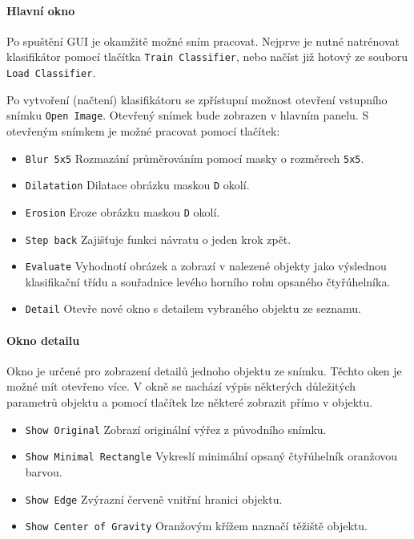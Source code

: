 \documentclass[12pt]{article}
\begin{document}
\paragraph{Hlavní okno}
Po spuštění GUI je okamžitě možné sním pracovat. Nejprve je nutné natrénovat klasifikátor pomocí tlačítka \texttt{Train Classifier}, nebo načíst již hotový ze souboru \texttt{Load Classifier}.

Po vytvoření (načtení) klasifikátoru se zpřístupní možnost otevření vstupního snímku \texttt{Open Image}. Otevřený snímek bude zobrazen v hlavním panelu. S otevřeným snímkem je možné pracovat pomocí tlačítek:
\begin{itemize}
\renewcommand\labelitemi{--}
\setlength\itemsep{1px}
\item{\texttt{Blur 5x5}} Rozmazání průměrováním pomocí masky o rozměrech \texttt{5x5}.
\item{\texttt{Dilatation}} Dilatace obrázku maskou \texttt{D} okolí.
\item{\texttt{Erosion}} Eroze obrázku maskou \texttt{D} okolí.
\item{\texttt{Step back}} Zajišťuje funkci návratu o jeden krok zpět.
\item{\texttt{Evaluate}} Vyhodnotí obrázek a zobrazí v nalezené objekty jako výslednou klasifikační třídu a souřadnice levého horního rohu opsaného čtyřúhelníka.
\item{\texttt{Detail}} Otevře nové okno s detailem vybraného objektu ze seznamu.
\end{itemize}

\paragraph{Okno detailu}
Okno je určené pro zobrazení detailů jednoho objektu ze snímku. Těchto oken je možné mít otevřeno více. V okně se nachází výpis některých důležitých parametrů objektu a pomocí tlačítek lze některé zobrazit přímo v objektu.

\begin{itemize}
\renewcommand\labelitemi{--}
\setlength\itemsep{1px}
\item{\texttt{Show Original}} Zobrazí originální výřez z původního snímku.
\item{\texttt{Show Minimal Rectangle}} Vykreslí minimální opsaný čtyřúhelník oranžovou barvou.
\item{\texttt{Show Edge}} Zvýrazní červeně vnitřní hranici objektu.
\item{\texttt{Show Center of Gravity}} Oranžovým křížem naznačí těžiště objektu.
\end{itemize}
\end{document}
